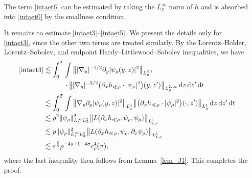 \documentclass[11pt,letterpaper,reqno]{amsart}
\numberwithin{equation}{section}
\theoremstyle{definition}
\theoremstyle{remark}
\begin{document}
The term \eqref{intaet6} can be estimated by taking the $L^\infty_x$ norm of $h$ and is absorbed into \eqref{intaet0} by the smallness condition.


It remains to estimate \eqref{intaet3}--\eqref{intaet5}. We present the
details only for \eqref{intaet3}, since the other two terms are treated
similarly. By the Lorentz--Hölder, Lorentz--Sobolev, and endpoint
Hardy--Littlewood--Sobolev inequalities, we have
\begin{align*}
\eqref{intaet3}
&\lesssim
\int_0^T\int
\big\|
|\nabla_y|^{-1/2}\partial_y
|\psi_\rho(y,z)|^2
\big\|_{L_y^{2,1}}
\\
&\qquad\quad\cdot
\big\|
|\nabla_y|^{-3/2}
\big(
\partial_xh_{\ll\rho}\cdot|\psi_\rho|^2
\big)(y,z')
\big\|_{L_y^{2,\infty}}
\,\mathrm dz\,\mathrm dz'\,\mathrm dt
\\
&\lesssim
\int_0^T\int
\big\|
\nabla_y\partial_y|\psi_\rho(y,z)|^2
\big\|_{L_y^1}
\big\|
\big(
\partial_xh_{\ll\rho}\cdot|\psi_\rho|^2
\big)(\cdot,z')
\big\|_{L_y^1}
\,\mathrm dz\,\mathrm dz'\,\mathrm dt
\\
&\lesssim
\rho^2
\|\psi_\rho\|_{L_t^\infty L_x^2}^2
\big\|
L(\partial_xh_{\ll\rho},\psi_\rho,\psi_\rho)
\big\|_{L_{t,x}^1}
\\
&\lesssim
\rho
\|\psi_\rho\|_{L_t^\infty L_x^2}^2
\big\|
L(\partial_xh_{\ll\rho},
  \psi_\rho,\partial_x\psi_\rho)
\big\|_{L_{t,x}^1}
\\
&\lesssim
\varepsilon^{\frac38}
\rho^{-4s+1-4\sigma}c_\rho^4(\sigma),
\end{align*}
 where the last inequality then follows from Lemma~\ref{lem_J1}.  This completes the proof.
\end{document}
